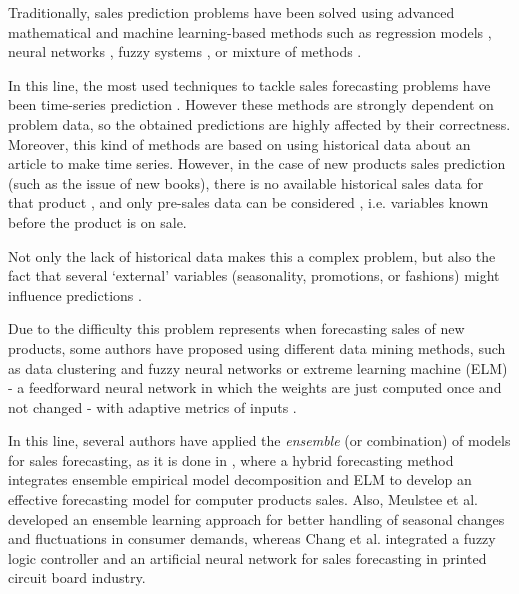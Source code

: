 \documentclass[a4paper,10pt,onecolumn,preprint,3p]{elsarticle}
\begin{document}
Traditionally, sales prediction problems have been solved using advanced mathematical and machine learning-based methods
such as regression models \cite{Papalexopoulos1990}, neural networks \cite{Yoo1999}, fuzzy systems \cite{Mastorocostas2001}, or mixture of methods \cite{Chang2006715,Meulstee2008,ChiJie2012}.

In this line, the most used techniques to tackle sales forecasting problems have been time-series prediction
\cite{Chu2003,Brown1959,Winters1960,Box1969,Papalexopoulos1990}. %
However these methods are strongly dependent on problem data, so the obtained predictions are highly affected by their correctness.
Moreover, this kind of methods are based on using historical data about an article to make time series. However, in the case of new products sales prediction (such as the issue of new books), there is no available historical sales data for that product \cite{ChingChin2010}, and only pre-sales data can be considered \cite{FaderHardie2005,Madsen2008}, 
i.e. variables known before the product is on sale. 

Not only the lack of historical data makes this a complex problem, but also the fact that several `external' variables (seasonality, promotions, or fashions) might influence predictions
\cite{Lapide1999,Thomassey2012,Xia2012,SThomassey2014,ChernWSF15}.

Due to the difficulty this problem represents when forecasting sales of new 
products, some authors have proposed using different data mining methods, such as data clustering and fuzzy neural networks \cite{Chang2009} or extreme learning machine (ELM) - a feedforward neural network in which the weights are just computed once and not changed - with adaptive metrics of inputs \cite{Xia2012}.

In this line, several authors have applied the \textit{ensemble} (or combination) of models for sales forecasting, as it is done in \cite{ChiJie2012}, where a hybrid forecasting method integrates ensemble empirical model decomposition and ELM to develop an effective forecasting model for computer products sales.
Also, Meulstee et al. \cite{Meulstee2008} developed an ensemble learning approach for better handling of seasonal changes and fluctuations in consumer demands, whereas Chang et al. \cite{Chang2006715} integrated a fuzzy logic controller and an artificial neural network for sales forecasting in printed circuit board industry.
\end{document}
